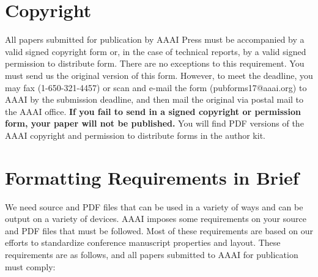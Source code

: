 \documentclass[letterpaper]{article}
\begin{document}
\section{Copyright}
All papers submitted for publication by AAAI Press must be accompanied by a valid signed copyright form or, in the case of technical reports, by a valid signed permission to distribute form. There are no exceptions to this requirement. You must send us the original version of this form. However, to meet the deadline, you may fax (1-650-321-4457) or scan and e-mail the form (pubforms17@aaai.org) to AAAI by the submission deadline, and then mail the original via postal mail to the AAAI office. \textbf{If you fail to send in a signed copyright or permission form, your paper will not be published.} You will find PDF versions of the AAAI copyright and permission to distribute forms in the author kit.

\section{Formatting Requirements in Brief}
We need source and PDF files that can be used in a variety of ways and can be output on a variety of devices. AAAI imposes some requirements on your source and PDF files that must be followed. Most of these requirements are based on our efforts to standardize conference manuscript properties and layout. These requirements are as follows, and all papers submitted to AAAI for publication must comply:
\end{document}
